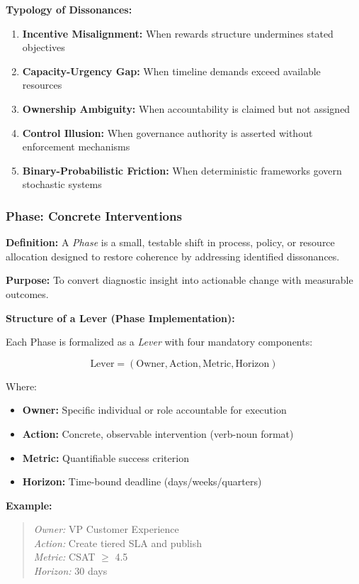 \documentclass[11pt,a4paper]{article}
\begin{document}
\textbf{Typology of Dissonances:}

\begin{enumerate}
\item \textbf{Incentive Misalignment:} When rewards structure undermines stated objectives
\item \textbf{Capacity-Urgency Gap:} When timeline demands exceed available resources
\item \textbf{Ownership Ambiguity:} When accountability is claimed but not assigned
\item \textbf{Control Illusion:} When governance authority is asserted without enforcement mechanisms
\item \textbf{Binary-Probabilistic Friction:} When deterministic frameworks govern stochastic systems
\end{enumerate}

\subsubsection{Phase: Concrete Interventions}

\textbf{Definition:} A \textit{Phase} is a small, testable shift in process, policy, or resource allocation designed to restore coherence by addressing identified dissonances.

\textbf{Purpose:} To convert diagnostic insight into actionable change with measurable outcomes.

\textbf{Structure of a Lever (Phase Implementation):}

Each Phase is formalized as a \textit{Lever} with four mandatory components:

\begin{equation}
\text{Lever} = (\text{Owner}, \text{Action}, \text{Metric}, \text{Horizon})
\end{equation}

Where:
\begin{itemize}
\item \textbf{Owner:} Specific individual or role accountable for execution
\item \textbf{Action:} Concrete, observable intervention (verb-noun format)
\item \textbf{Metric:} Quantifiable success criterion
\item \textbf{Horizon:} Time-bound deadline (days/weeks/quarters)
\end{itemize}

\textbf{Example:}
\begin{quote}
\textit{Owner:} VP Customer Experience \\
\textit{Action:} Create tiered SLA and publish \\
\textit{Metric:} CSAT $\geq$ 4.5 \\
\textit{Horizon:} 30 days
\end{quote}
\end{document}
